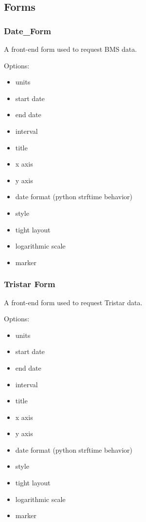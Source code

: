 \subsection{Forms}\label{forms-1}

\subsubsection{Date\_Form}\label{dateux5fform}

A front-end form used to request BMS data.

Options:

\begin{itemize}
\itemsep1pt\parskip0pt
\item
  units
\item
  start date
\item
  end date
\item
  interval
\item
  title
\item
  x axis
\item
  y axis
\item
  date format (python strftime behavior)
\item
  style
\item
  tight layout
\item
  logarithmic scale
\item
  marker
\end{itemize}

\subsubsection{Tristar Form}\label{tristar-form}

A front-end form used to request Tristar data.

Options:

\begin{itemize}
\itemsep1pt\parskip0pt
\item
  units
\item
  start date
\item
  end date
\item
  interval
\item
  title
\item
  x axis
\item
  y axis
\item
  date format (python strftime behavior)
\item
  style
\item
  tight layout
\item
  logarithmic scale
\item
  marker
\end{itemize}

